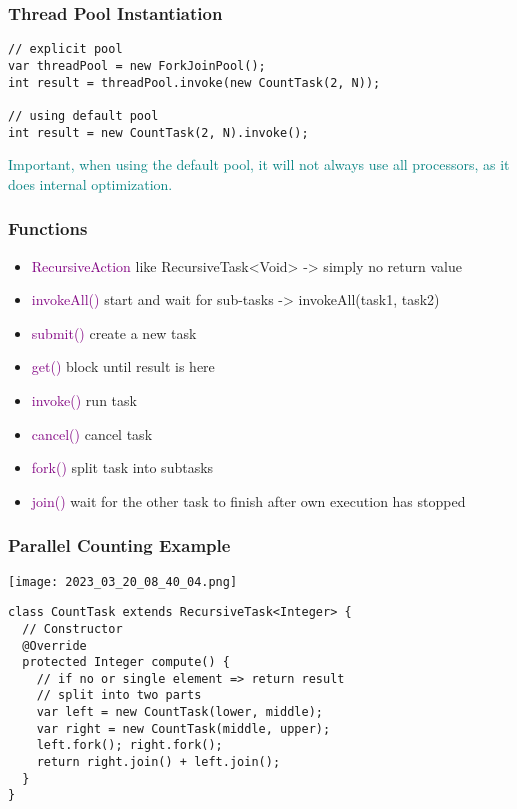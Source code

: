 \documentclass[main.tex,fontsize=8pt,paper=a4,paper=portrait,DIV=calc,]{scrartcl}
\begin{document}
\subsubsection{Thread Pool Instantiation}
\begin{lstlisting}
// explicit pool
var threadPool = new ForkJoinPool();
int result = threadPool.invoke(new CountTask(2, N));

// using default pool
int result = new CountTask(2, N).invoke();
\end{lstlisting}
\textcolor{teal}{Important, when using the default pool, it will not always use all processors, as it does internal optimization.}

\subsubsection{Functions}
\begin{itemize}
\item \textcolor{purple}{RecursiveAction}\newline
  like RecursiveTask<Void> -> simply no return value
\item \textcolor{purple}{invokeAll()}\newline
  start and wait for sub-tasks -> invokeAll(task1, task2)
\item \textcolor{purple}{submit()}\newline
  create a new task
\item \textcolor{purple}{get()}\newline
  block until result is here
\item \textcolor{purple}{invoke()}\newline
  run task
\item \textcolor{purple}{cancel()}\newline
  cancel task
\item \textcolor{purple}{fork()}\newline
  split task into subtasks 
\item \textcolor{purple}{join()}
  wait for the other task to finish after own execution has stopped
\end{itemize} 

\subsubsection{Parallel Counting Example}
\texttt{[image: 2023\_03\_20\_08\_40\_04.png]}
\begin{lstlisting}
class CountTask extends RecursiveTask<Integer> {
  // Constructor
  @Override
  protected Integer compute() {
    // if no or single element => return result
    // split into two parts
    var left = new CountTask(lower, middle);
    var right = new CountTask(middle, upper);
    left.fork(); right.fork();
    return right.join() + left.join();
  }
}
\end{lstlisting}
\end{document}
